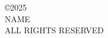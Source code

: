 
\begin{center}
\begin{singlespace}
\copyright 2025\\
NAME\\
ALL RIGHTS RESERVED
\end{singlespace}
\vspace*{52pt}
\end{center}

\clearpage
